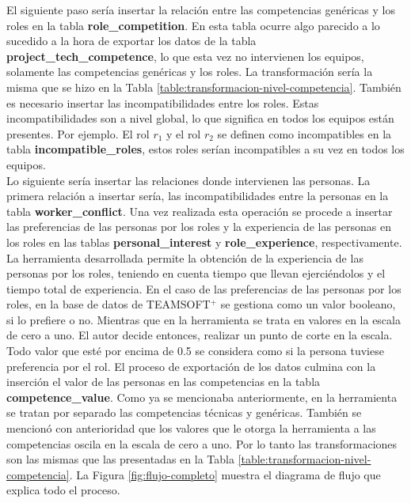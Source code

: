 El siguiente paso sería insertar la relación entre las competencias genéricas y los roles en la tabla \textbf{role\_competition}. En esta tabla ocurre algo parecido a lo sucedido a la hora de exportar los datos de la tabla \textbf{project\_tech\_competence}, lo que esta vez no intervienen los equipos, solamente las competencias genéricas y los roles. La transformación sería la misma que se hizo en la Tabla \ref{table:transformacion-nivel-competencia}. También es necesario insertar las incompatibilidades entre los roles. Estas incompatibilidades son a nivel global, lo que significa en todos los equipos están presentes. Por ejemplo. El rol $r_1$ y el rol $r_2$ se definen como incompatibles en la tabla \textbf{incompatible\_roles}, estos roles serían incompatibles a su vez en todos los equipos.\\

Lo siguiente sería insertar las relaciones donde intervienen las personas. La primera relación a insertar sería, las incompatibilidades entre la personas en la tabla \textbf{worker\_conflict}. Una vez realizada esta operación se procede a insertar las preferencias de las personas por los roles y la experiencia de las personas en los roles en las tablas \textbf{personal\_interest} y \textbf{role\_experience}, respectivamente. La herramienta desarrollada permite la obtención de la experiencia de las personas por los roles, teniendo en cuenta tiempo que llevan ejerciéndolos y el tiempo total de experiencia. En el caso de las preferencias de las personas por los roles, en la base de datos de TEAMSOFT$^+$ se gestiona como un valor booleano, si lo prefiere o no. Mientras que en la herramienta se trata en valores en la escala de cero a uno. El autor decide entonces, realizar un punto de corte en la escala. Todo valor que esté por encima de 0.5 se considera como si la persona tuviese preferencia por el rol. El proceso de exportación de los datos culmina con la inserción el valor de las personas en las competencias en la tabla \textbf{competence\_value}. Como ya se mencionaba anteriormente, en la herramienta se tratan por separado las competencias técnicas y genéricas. También se mencionó con anterioridad que los valores que le otorga la herramienta a las competencias oscila en la escala de cero a uno. Por lo tanto las transformaciones son las mismas que las presentadas en la Tabla \ref{table:transformacion-nivel-competencia}. La Figura \ref{fig:flujo-completo} muestra el diagrama de flujo que explica todo el proceso.

